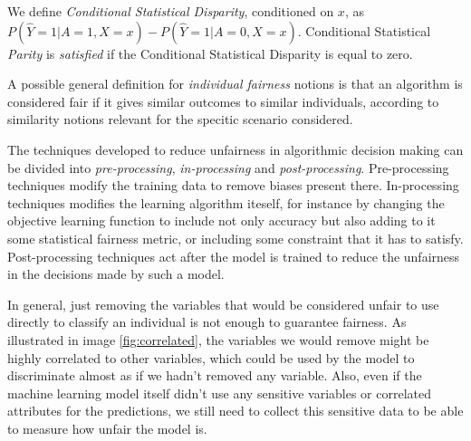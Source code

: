 \begin{definition} We define \emph{Conditional Statistical Disparity}, conditioned on $x$, as $P(\hat Y = 1| A = 1, X = x) - P(\hat Y = 1| A = 0, X = x)$. Conditional Statistical \emph{Parity} is \emph{satisfied} if the Conditional Statistical Disparity is equal to zero.
\end{definition}

A possible general definition for \emph{individual fairness} notions is that an algorithm is considered fair if it gives similar outcomes to similar individuals, according to similarity notions relevant for the specitic scenario considered.

The techniques developed to reduce unfairness in algorithmic decision making can be divided into \emph{pre-processing}, \emph{in-processing} and \emph{post-processing}. Pre-processing techniques modify the training data to remove biases present there. In-processing techniques modifies the learning algorithm iteself, for instance by changing the objective learning function to include not only accuracy but also adding to it some statistical fairness metric, or including some constraint that it has to satisfy. Post-processing techniques act after the model is trained to reduce the unfairness in the decisions made by such a model.

In general, just removing the variables that would be considered unfair to use directly to classify an individual is not enough to guarantee fairness. As illustrated in image \ref{fig:correlated}, the variables we would remove might be highly correlated to other variables, which could be used by the model to discriminate almost as if we hadn't removed any variable. Also, even if the machine learning model itself didn't use any sensitive variables or correlated attributes for the predictions, we still need to collect this sensitive data to be able to measure how unfair the model is.

